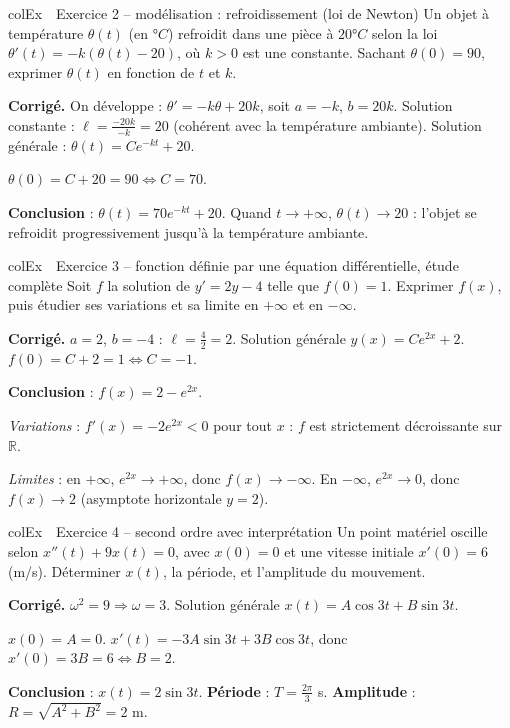 \documentclass[11pt,a4paper]{article}
\newenvironment{exemple}[1][Exemple]
  {\begin{fiche}{colEx}{\ding{217}~~#1}}{\end{fiche}}
\begin{document}
\begin{exemple}[Exercice 2 -- modélisation : refroidissement (loi de Newton)]
Un objet à température $\theta(t)$ (en $°C$) refroidit dans une pièce à $20°C$ selon la loi $\theta'(t)=-k(\theta(t)-20)$, où $k>0$ est une constante. Sachant $\theta(0)=90$, exprimer $\theta(t)$ en fonction de $t$ et $k$.

\smallskip
\textbf{Corrigé.} On développe : $\theta'=-k\theta+20k$, soit $a=-k$, $b=20k$. Solution constante : $\ell=\frac{-20k}{-k}=20$ (cohérent avec la température ambiante). Solution générale : $\theta(t)=Ce^{-kt}+20$.

\smallskip
$\theta(0)=C+20=90\iff C=70$.

\smallskip
\textbf{Conclusion} : $\theta(t)=70e^{-kt}+20$. Quand $t\to+\infty$, $\theta(t)\to20$ : l'objet se refroidit progressivement jusqu'à la température ambiante.
\end{exemple}

\begin{exemple}[Exercice 3 -- fonction définie par une équation différentielle, étude complète]
Soit $f$ la solution de $y'=2y-4$ telle que $f(0)=1$. Exprimer $f(x)$, puis étudier ses variations et sa limite en $+\infty$ et en $-\infty$.

\smallskip
\textbf{Corrigé.} $a=2$, $b=-4$ : $\ell=\frac{4}{2}=2$. Solution générale $y(x)=Ce^{2x}+2$. $f(0)=C+2=1\iff C=-1$.

\smallskip
\textbf{Conclusion} : $f(x)=2-e^{2x}$.

\smallskip
\emph{Variations} : $f'(x)=-2e^{2x}<0$ pour tout $x$ : $f$ est strictement décroissante sur $\mathbb{R}$.

\smallskip
\emph{Limites} : en $+\infty$, $e^{2x}\to+\infty$, donc $f(x)\to-\infty$. En $-\infty$, $e^{2x}\to0$, donc $f(x)\to2$ (asymptote horizontale $y=2$).
\end{exemple}

\begin{exemple}[Exercice 4 -- second ordre avec interprétation]
Un point matériel oscille selon $x''(t)+9x(t)=0$, avec $x(0)=0$ et une vitesse initiale $x'(0)=6$ (m/s). Déterminer $x(t)$, la période, et l'amplitude du mouvement.

\smallskip
\textbf{Corrigé.} $\omega^2=9\Rightarrow\omega=3$. Solution générale $x(t)=A\cos3t+B\sin3t$.

\smallskip
$x(0)=A=0$. $x'(t)=-3A\sin3t+3B\cos3t$, donc $x'(0)=3B=6\iff B=2$.

\smallskip
\textbf{Conclusion} : $x(t)=2\sin3t$. \textbf{Période} : $T=\frac{2\pi}{3}$ s. \textbf{Amplitude} : $R=\sqrt{A^2+B^2}=2$ m.
\end{exemple}
\end{document}
